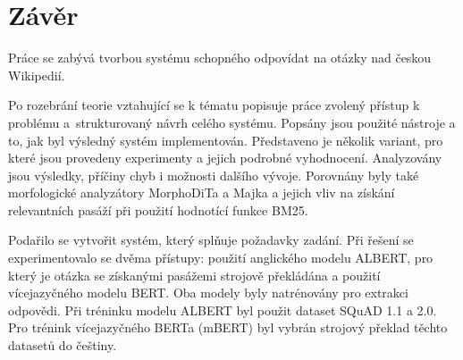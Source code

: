 
\chapter{Závěr}
\label{conclusion}
Práce se zabývá tvorbou systému schopného odpovídat na otázky nad českou Wikipedií.\par

Po rozebrání teorie vztahující se k tématu popisuje práce zvolený přístup k problému a~strukturovaný návrh celého systému. Popsány jsou použité nástroje a to, jak byl výsledný systém implementován. Představeno je několik variant, pro které jsou provedeny experimenty a jejich podrobné vyhodnocení. Analyzovány jsou výsledky, příčiny chyb i možnosti dalšího vývoje. Porovnány byly také morfologické analyzátory MorphoDiTa a Majka a jejich vliv na získání relevantních pasáží při použití hodnotící funkce BM25.\par
\smallskip

Podařilo se vytvořit systém, který splňuje požadavky zadání. Při řešení se experimentovalo se dvěma přístupy: použití anglického modelu ALBERT, pro který je otázka se získanými pasážemi strojově překládána a použití vícejazyčného modelu BERT. Oba modely byly natrénovány pro extrakci odpovědi. Při tréninku modelu ALBERT byl použit dataset SQuAD 1.1 a 2.0. Pro trénink vícejazyčného BERTa (mBERT) byl vybrán strojový překlad těchto datasetů do češtiny.\par

